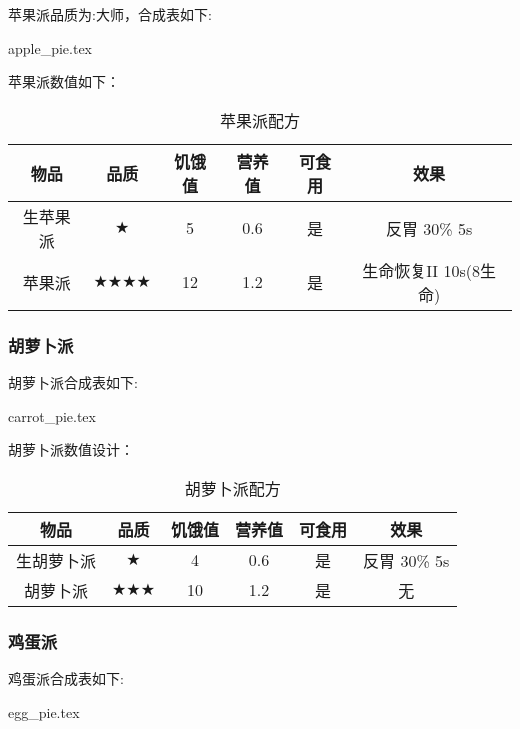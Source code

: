 苹果派品质为:大师，合成表如下:

{apple_pie.tex}

苹果派数值如下：

\begin{table}[H]
    \centering
    \caption{苹果派配方}
    \setlength{\tabcolsep}{4mm}
    \begin{tabular}{c|ccc|cc}
        \toprule
        \textbf{物品} & \textbf{品质} & \textbf{饥饿值} & \textbf{营养值} & \textbf{可食用} & \textbf{效果}\\
        \midrule
        生苹果派 & $\bigstar$ & 5 & 0.6 & 是 & 反胃 30\% 5s \\
        苹果派 & $\bigstar \bigstar \bigstar \bigstar$ & 12 & 1.2 & 是 & 生命恢复II 10s(8生命) \\
        \bottomrule
    \end{tabular}
\end{table}

\subsubsection{胡萝卜派}

胡萝卜派合成表如下:

{carrot_pie.tex}

胡萝卜派数值设计：

\begin{table}[H]
    \centering
    \caption{胡萝卜派配方}
    \setlength{\tabcolsep}{4mm}
    \begin{tabular}{c|ccc|cc}
        \toprule
        \textbf{物品} & \textbf{品质} & \textbf{饥饿值} & \textbf{营养值} & \textbf{可食用} & \textbf{效果}\\
        \midrule
        生胡萝卜派 & $\bigstar$ &4 & 0.6 & 是 & 反胃 30\% 5s \\
        胡萝卜派 & $\bigstar \bigstar \bigstar$ & 10 & 1.2 & 是 & 无 \\
        \bottomrule
    \end{tabular}
\end{table}

\subsubsection{鸡蛋派}

鸡蛋派合成表如下:

{egg_pie.tex}

